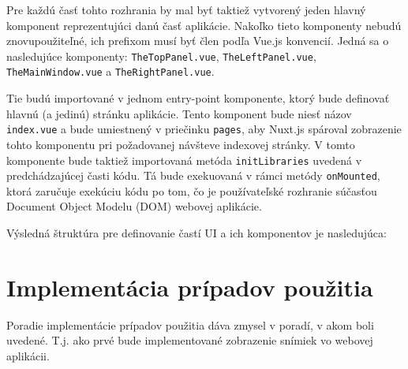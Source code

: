 Pre každú časť tohto rozhrania by mal byť taktiež vytvorený jeden hlavný komponent reprezentujúci danú časť aplikácie. Nakoľko tieto komponenty nebudú znovupoužiteľné, ich prefixom musí byť člen  podľa Vue.js konvencií. Jedná sa o nasledujúce komponenty: \texttt{TheTopPanel.vue}, \texttt{TheLeftPanel.vue}, \texttt{TheMainWindow.vue} a \texttt{TheRightPanel.vue}.

Tie budú importované v jednom entry-point komponente, ktorý bude definovať hlavnú (a jedinú) stránku aplikácie. Tento komponent bude niesť názov \texttt{index.vue} a bude umiestnený v priečinku \texttt{pages}, aby Nuxt.js spároval zobrazenie tohto komponentu pri požadovanej návšteve indexovej stránky. V tomto komponente bude taktiež importovaná metóda \texttt{initLibraries} uvedená v predchádzajúcej časti kódu. Tá bude exekuovaná v rámci metódy \texttt{onMounted}, ktorá zaručuje exekúciu kódu po tom, čo je používateľské rozhranie súčasťou Document Object Modelu (DOM) webovej aplikácie.

\clearpage

Výsledná štruktúra pre definovanie častí UI a ich komponentov je nasledujúca:
\begin{figure}[H]
\end{figure}

\section{Implementácia prípadov použitia}
Poradie implementácie prípadov použitia dáva zmysel v poradí, v akom boli uvedené. T.j. ako prvé bude implementované zobrazenie snímiek vo webovej aplikácii. 

